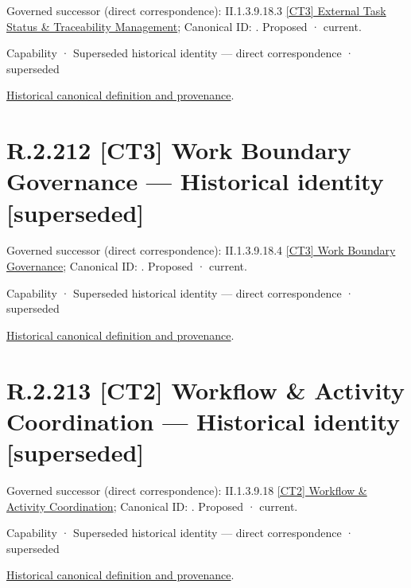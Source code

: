 {\small Governed successor (direct correspondence): II.1.3.9.18.3 \hyperref[element:b25bb04a8aa94dcfac105a646878ccfc]{[CT3] External Task Status \& Traceability Management}; Canonical ID: \texttt{}. Proposed · current.}\par
\label{element:95985d244a234571892a9e9b4024f594}
{\small Capability · Superseded historical identity — direct correspondence · superseded}\par
\href{../../../../../../../continuum/strategy/capability/95985d244a234571892a9e9b4024f594.md}{Historical canonical definition and provenance}.\par
\section*{R.2.212 [CT3] Work Boundary Governance — Historical identity [superseded]}
\label{navigation:R.2.212}

{\small Governed successor (direct correspondence): II.1.3.9.18.4 \hyperref[element:35b66a0b38db4568849ecb842ffdcbf3]{[CT3] Work Boundary Governance}; Canonical ID: \texttt{}. Proposed · current.}\par
\label{element:b4d14abf930a4230a7f5b93e9ce3df91}
{\small Capability · Superseded historical identity — direct correspondence · superseded}\par
\href{../../../../../../../continuum/strategy/capability/b4d14abf930a4230a7f5b93e9ce3df91.md}{Historical canonical definition and provenance}.\par
\section*{R.2.213 [CT2] Workflow \& Activity Coordination — Historical identity [superseded]}
\label{navigation:R.2.213}

{\small Governed successor (direct correspondence): II.1.3.9.18 \hyperref[element:c724f3d38bfa4567983a11ad22095d61]{[CT2] Workflow \& Activity Coordination}; Canonical ID: \texttt{}. Proposed · current.}\par
\label{element:4422d865978c4353ad575759c6026d27}
{\small Capability · Superseded historical identity — direct correspondence · superseded}\par
\href{../../../../../../../continuum/strategy/capability/4422d865978c4353ad575759c6026d27.md}{Historical canonical definition and provenance}.\par
